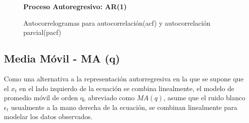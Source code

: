 
\begin{figure}[h]
		\centering
		\textbf{Proceso Autoregresivo: AR(1)}\par\medskip
		\caption{Autocorrelogramas para autocorrelación(acf) y autocorrelación parcial(pacf)}\label{fig8}

\end{figure}


\pagebreak
\subsection{Media M\'ovil - MA (q)}

Como una alternativa a la representaci\'on autorregresiva en la que se supone que el $x_t$ en el lado izquierdo de la ecuaci\'on se combina linealmente, el modelo de promedio m\'ovil de orden q, abreviado como $MA (q)$, asume que el ruido blanco $\epsilon_t$ usualmente a la mano derecha de la ecuaci\'on, se combinan linealmente para modelar los datos observados.


